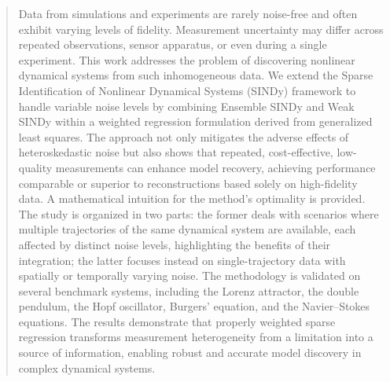 \begin{abstract}
Data from simulations and experiments are rarely noise-free and often exhibit varying levels of fidelity. 
Measurement uncertainty may differ across repeated observations, sensor apparatus, or even during a single experiment. 
This work addresses the problem of discovering nonlinear dynamical systems from such inhomogeneous data. 
We extend the Sparse Identification of Nonlinear Dynamical Systems (SINDy) framework to handle variable noise levels
by combining Ensemble SINDy and Weak SINDy within a weighted regression formulation derived from generalized least squares. 
The approach not only mitigates the adverse effects of heteroskedastic noise but also shows that repeated, cost-effective,
low-quality measurements can enhance model recovery, achieving performance comparable or superior to reconstructions
based solely on high-fidelity data. A mathematical intuition for the method’s optimality is provided.
The study is organized in two parts: the former deals with scenarios where multiple trajectories of the same dynamical system are available, 
each affected by distinct noise levels, highlighting the benefits of their integration; the latter focuses instead on single-trajectory data with spatially or temporally varying noise. 
The methodology is validated on several benchmark systems, including the Lorenz attractor,
the double pendulum, the Hopf oscillator, Burgers’ equation, and the Navier–Stokes equations.
The results demonstrate that properly weighted sparse regression transforms measurement heterogeneity from a limitation into a source of information, enabling robust and accurate model discovery in complex dynamical systems.
\end{abstract}
